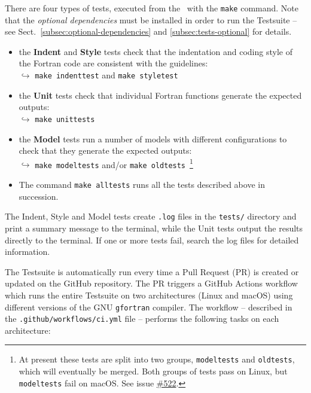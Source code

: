 There are four types of tests, executed from the \maindir\ with
the \verb|make| command. Note that the \emph{optional dependencies}
must be installed in order to run the Testsuite -- see
Sect.~\ref{subsec:optional-dependencies} and \ref{subsec:tests-optional}
for details.

\begin{itemize}
\item the \textbf{Indent} and \textbf{Style} tests check that the
  indentation and coding style of the Fortran code are consistent with
  the guidelines:\\
  $\hookrightarrow$ \verb|make indenttest| and \verb|make styletest|
\item the \textbf{Unit} tests check that individual Fortran functions
  generate the expected outputs:\\
  $\hookrightarrow$ \verb|make unittests|
\item the \textbf{Model} tests run a number of models with different
  configurations to check that they generate the expected outputs:\\
  $\hookrightarrow$ \verb|make modeltests| and/or
  \verb|make oldtests|~\footnote{At present these tests are split into
    two groups, \texttt{modeltests} and \texttt{oldtests}, which will
    eventually be merged. Both groups of tests pass on Linux, but
    \texttt{modeltests} fail on macOS. See issue
    \href{https://github.com/AtChem/AtChem2/issues/522}{\#522}.}
\item The command \verb|make alltests| runs all the tests described
  above in succession.
\end{itemize}

The Indent, Style and Model tests create \texttt{.log} files in the
\texttt{tests/} directory and print a summary message to the terminal,
while the Unit tests output the results directly to the terminal. If
one or more tests fail, search the log files for detailed information.

The Testsuite is automatically run every time a Pull Request (PR) is
created or updated on the GitHub repository. The PR triggers a GitHub
Actions workflow which runs the entire Testsuite on two architectures
(Linux and macOS) using different versions of the GNU
\texttt{gfortran} compiler. The workflow -- described in the
\texttt{.github/workflows/ci.yml} file -- performs the following tasks
on each architecture:

